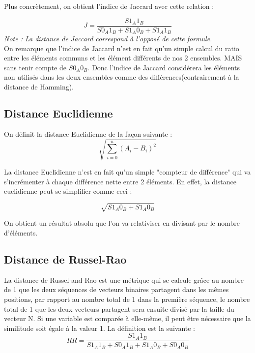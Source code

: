 \documentclass[11pt]{article}
\begin{document}
Plus concrètement, on obtient l'indice de Jaccard avec cette relation :

\begin{equation}
  J =\frac{ S1_{A}1_{B} }{S0_{A}1_{B}+S1_{A}0_{B}+S1_{A}1_{B}}
\end{equation}
\textit{Note : La distance de Jaccard correspond à l'opposé de cette formule.}
\\


On remarque que l'indice de Jaccard n'est en fait qu'un simple calcul du ratio entre les éléments communs et les élément différents de nos 2 ensembles. MAIS sans tenir compte de $S0_{A}0_{B}$. Donc l'indice de Jaccard considérera les éléments non utilisés dans les deux ensembles comme des différences(contrairement à la distance de Hamming).




\subsection{Distance Euclidienne}

On définit la distance Euclidienne de la façon suivante :
\begin{equation}
 \sqrt{\sum_{i=0}^n (A_{i}-B_{i})^2}
\end{equation}

La distance Euclidienne n'est en fait qu'un simple "compteur de différence" qui va s'incrémenter à chaque différence nette entre 2 éléments. En effet, la distance euclidienne peut se simplifier comme ceci :

\begin{equation}
 \sqrt{S1_{A}0_{B}+S1_{A}0_{B}}
\end{equation}

On obtient un résultat absolu que l'on va relativiser en divisant par le nombre d'éléments.

\subsection{Distance de Russel-Rao}
La distance de Russel-and-Rao est une métrique qui se calcule grâce au nombre de 1 que les deux séquences  de vecteurs binaires partagent dans les mêmes positions, par rapport au nombre total de 1 dans la première séquence, le nombre total de 1 que les deux vecteurs partagent sera ensuite divisé par la taille du vecteur N.  Si une variable est comparée à elle-même, il peut être nécessaire que la similitude soit égale à la valeur 1.
La définition est la suivante :
\begin{equation}
   RR = \frac{S1_{A}1_{B}}{S1_{A}1_{B} + S0_{A}1_{B}+S1_{A}0_{B} + S0_{A}0_{B}}
\end{equation}
\end{document}
